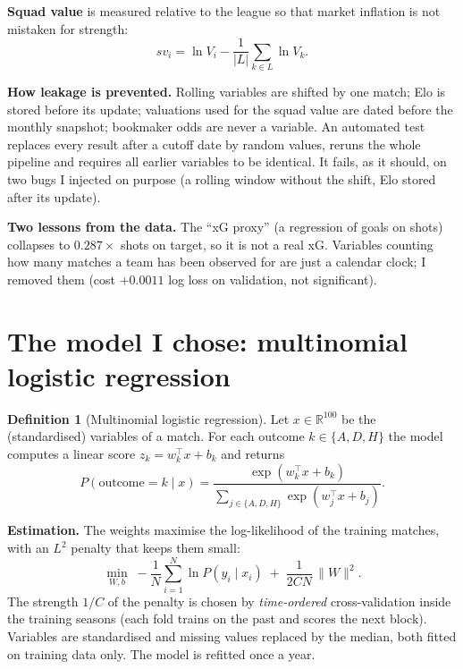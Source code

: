 \documentclass[11pt,a4paper]{article}
\theoremstyle{definition}
\newtheorem{definition}{Definition}[section]
\theoremstyle{remark}
\begin{document}
\textbf{Squad value} is measured relative to the league so that market inflation is not mistaken for strength:
\begin{equation}sv_i=\ln V_i-\frac{1}{|L|}\sum_{k\in L}\ln V_k.\end{equation}

\textbf{How leakage is prevented.} Rolling variables are shifted by one match; Elo is stored before its update; valuations used for the squad value are dated before the monthly snapshot;
bookmaker odds are never a variable. An automated test replaces every result after a cutoff date by random values, reruns the whole pipeline and requires all earlier variables to be identical.
It fails, as it should, on two bugs I injected on purpose (a rolling window without the shift, Elo stored after its update).

\textbf{Two lessons from the data.} The ``xG proxy'' (a regression of goals on shots) collapses to $0.287\times$ shots on target, so it is not a real xG.
Variables counting how many matches a team has been observed for are just a calendar clock; I removed them (cost $+0.0011$ log loss on validation, not significant).

\section{The model I chose: multinomial logistic regression}\label{sec:model}

\begin{definition}[Multinomial logistic regression]
Let $x\in\mathbb{R}^{100}$ be the (standardised) variables of a match. For each outcome $k\in\{A,D,H\}$ the model computes a linear score $z_k=w_k^\top x+b_k$ and returns
\begin{equation}P(\text{outcome}=k\mid x)=\frac{\exp(w_k^\top x+b_k)}{\sum_{j\in\{A,D,H\}}\exp(w_j^\top x+b_j)}.\end{equation}
\end{definition}

\textbf{Estimation.} The weights maximise the log-likelihood of the training matches, with an $L^2$ penalty that keeps them small:
\begin{equation}\min_{W,b}\; -\frac1N\sum_{i=1}^{N}\ln P(y_i\mid x_i)\;+\;\frac{1}{2CN}\,\|W\|^2 .\end{equation}
The strength $1/C$ of the penalty is chosen by \emph{time-ordered} cross-validation inside the training seasons (each fold trains on the past and scores the next block).
Variables are standardised and missing values replaced by the median, both fitted on training data only. The model is refitted once a year.
\end{document}

